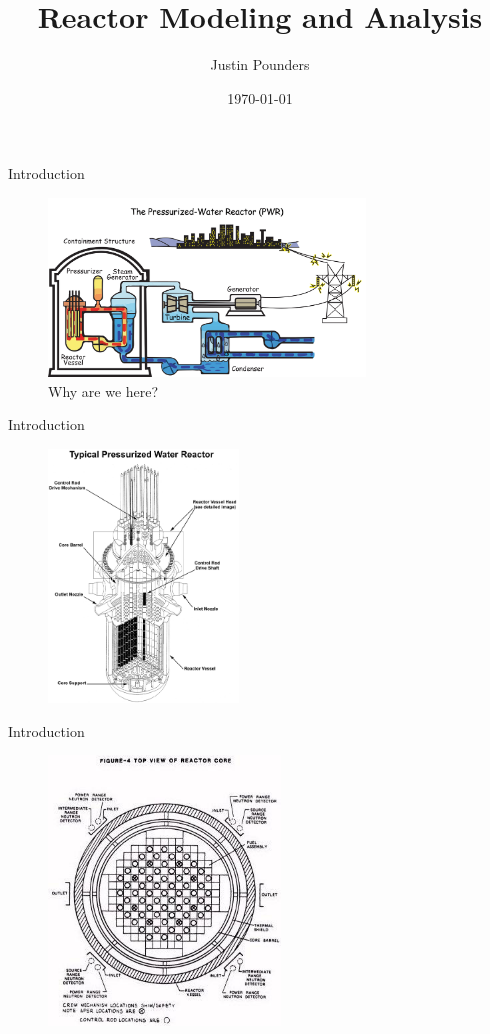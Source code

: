\documentclass[presentation]{beamer}
\author{Justin Pounders}
\date{\today}
\title{Reactor Modeling and Analysis}
\begin{document}
\maketitle

\begin{frame}[label={sec:orgheadline1}]{Introduction}
\begin{figure}
  \centering
  \includegraphics[width=0.75\textwidth]{nukePlan.png}
  \caption{Why are we here?}
\end{figure}
\end{frame}
\begin{frame}[label={sec:orgheadline2}]{Introduction}
\begin{figure}
  \centering
  \includegraphics[width=0.45\textwidth]{pwr-rx-vessel-large.png}
\end{figure}
\end{frame}
\begin{frame}[label={sec:orgheadline3}]{Introduction}
\begin{figure}
  \centering
  \includegraphics[width=0.55\textwidth]{lwrPlanView.png}
\end{figure}
\end{frame}
\end{document}
